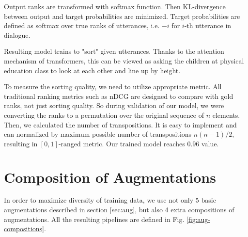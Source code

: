 \documentclass{article}
\begin{document}
Output ranks are transformed with softmax function. Then KL-divergence between output and target probabilities are minimized. Target probabilities are defined as softmax over true ranks of utterances, i.e. $-i$ for $i$-th utterance in dialogue.

Resulting model trains to "sort" given utterances. Thanks to the attention mechanism of transformers, this can be viewed as asking the children at physical education class to look at each other and line up by height.

To measure the sorting quality, we need to utilize appropriate metric. All traditional ranking metrics such as nDCG are designed to compare with gold ranks, not just sorting quality. So during validation of our model, we were converting the ranks to a permutation over the original sequence of $n$ elements. Then, we calculated the number of transpositions. It is easy to implement and can normalized by maximum possible number of transpositions $n(n-1)/2$, resulting in $[0,1]$-ranged metric. Our trained model reaches $0.96$ value.

\section{Composition of Augmentations}

In order to maximize diversity of training data, we use not only 5 basic augmentations described in section \ref{sec:aug}, but also 4 extra compositions of augmentations. All the resulting pipelines are defined in Fig. \ref{fig:aug-compositions}. 
\end{document}
